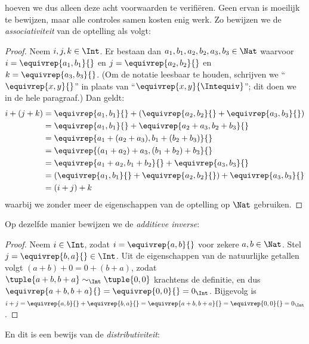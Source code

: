 \documentclass[openany]{memoir}
\begin{document}
hoeven we dus alleen deze acht voorwaarden te verifiëren. Geen ervan
is moeilijk te bewijzen, maar alle controles samen kosten enig werk.
Zo bewijzen we de \emph{associativiteit} van de optelling als volgt:
\begin{proof} 
Neem $i, j, k \in \Int$. Er bestaan dan $a_1, b_1, a_2, b_2, a_3, b_3 \in
\Nat$ waarvoor $i = \equivrep{a_1, b_1}{}$ en $j =
\equivrep{a_2,b_2}{}$ en $k = \equivrep{a_3, b_3}{}$. (Om de
notatie leesbaar te houden, schrijven we ``$\equivrep{x, y}{}$'' in plaats van
``$\equivrep{x, y}{\Intequiv}$''; dit doen we in de hele
paragraaf.) Dan geldt:
\begin{align*}
	i + (j + k) &= \equivrep{a_1, b_1}{}+(\equivrep{a_2, b_2}{} + \equivrep{a_3, b_3}{}) \\
	&= \equivrep{a_1,  b_1}{} + \equivrep{a_2+a_3, b_2+b_3}{}\\
	&= \equivrep{a_1 + (a_2 + a_3), b_1 + (b_2 + b_3)}{}\\
	&= \equivrep{(a_1 + a_2) + a_3, (b_1 + b_2) + b_3}{}\\
	&= \equivrep{a_1 + a_2, b_1 + b_2}{} + \equivrep{a_3, b_3}{}\\
	&= (\equivrep{a_1, b_1}{} + \equivrep{a_2, b_2}{}) + \equivrep{a_3, b_3}{}\\
	&= (i+j) + k
\end{align*}
waarbij we zonder meer de eigenschappen van de optelling op $\Nat$
gebruiken.
\end{proof}
Op dezelfde manier bewijzen we de \emph{additieve inverse}:
\begin{proof}
Neem $i \in \Int$, zodat $i = \equivrep{a,b}{}$ voor zekere $a,b \in
\Nat$. Stel $j = \equivrep{b,a}{} \in \Int$. Uit de eigenschappen van
de natuurlijke getallen volgt $(a+b) + 0 = 0 + (b+a)$, zodat
$\tuple{a+b, b+a} \sim_\Int \tuple{0,0}$ krachtens de definitie, en dus
$\equivrep{a+b, b+a}{} = \equivrep{0, 0}{} = 0_\Int$. Bijgevolg is $i + j =
\equivrep{a,b}{}+\equivrep{b,a}{}=\equivrep{a+b, b+a}{}= \equivrep{0,
0}{} = 0_\Int$.
\end{proof}
En dit is een bewijs van de \emph{distributiviteit}:
\end{document}
